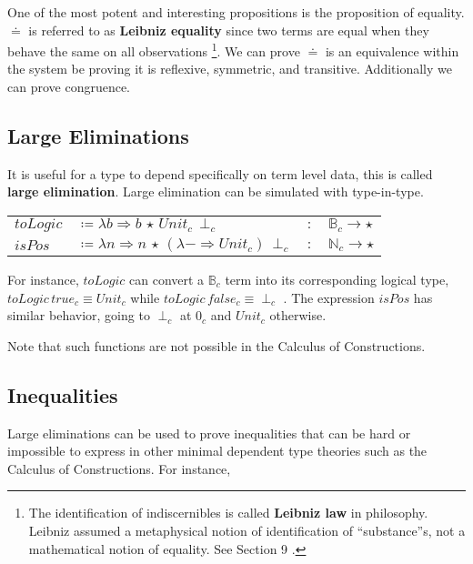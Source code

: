 One of the most potent and interesting propositions is the proposition of equality.
$\doteq$ is referred to as \textbf{Leibniz equality} since two terms are equal when they behave the same on all observations \footnote{The identification of indiscernibles is called \textbf{Leibniz law} in philosophy.
Leibniz assumed a metaphysical notion of identification of ``substance''s, not a mathematical notion of equality.
See Section 9 \cite{Leibniz1686}.}.
We can prove $\doteq$ is an equivalence within the system be proving it is reflexive, symmetric, and transitive.
Additionally we can prove congruence.


\subsection{Large Eliminations}


It is useful for a type to depend specifically on term level data, this is called \textbf{large elimination}.
Large elimination can be simulated with type-in-type.

\begin{tabular}{llll}
  $toLogic$ & $\coloneqq\lambda b\Rightarrow b\,\star\,Unit_{c}\,\perp_{c}$ & $:$ & $\mathbb{B}_{c}\rightarrow\star$\tabularnewline
  $isPos$ & $\coloneqq\lambda n\Rightarrow n\,\star\,(\lambda-\Rightarrow Unit_{c})\,\perp_{c}$ & $:$ & $\mathbb{N}_{c}\rightarrow\star$\tabularnewline
  \end{tabular}
  
For instance, $toLogic$ can convert a $\mathbb{B}_{c}$ term into its corresponding logical type, $toLogic\,true_{c}\equiv Unit_{c}$ while $toLogic\,false_{c}\equiv\perp_{c}$ .
The expression $isPos$ has similar behavior, going to $\perp_{c}$ at $0_{c}$ and $Unit_{c}$ otherwise.

Note that such functions are not possible in the Calculus of Constructions.

\subsection{Inequalities}

Large eliminations can be used to prove inequalities that can be hard or impossible to express in other minimal dependent type theories such as the Calculus of Constructions.
For instance,

